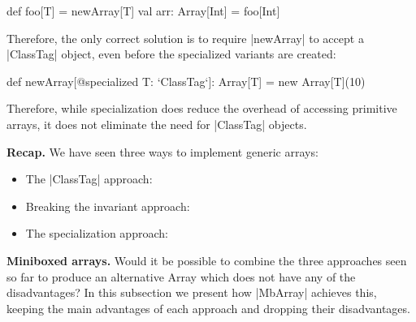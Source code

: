 \begin{lstlisting-nobreak}
 def foo[T] = newArray[T]
 val arr: Array[Int] = foo[Int]
\end{lstlisting-nobreak}

Therefore, the only correct solution is to require |newArray| to accept a |ClassTag| object, even before the specialized variants are created:

\begin{lstlisting-nobreak}
 def newArray[@specialized T: `ClassTag`]: Array[T] =
   new Array[T](10)
\end{lstlisting-nobreak}

Therefore, while specialization does reduce the overhead of accessing primitive arrays, it does not eliminate the need for |ClassTag| objects.

\textbf{Recap.} We have seen three ways to implement generic arrays:

\vspace{-1em}
\begin{itemize}
  \item The |ClassTag| approach:
  \item Breaking the invariant approach:
  \item The specialization approach:
\end{itemize}
\vspace{-1em}

\textbf{Miniboxed arrays.} Would it be possible to combine the three approaches seen so far to produce an alternative Array which does not have any of the disadvantages? In this subsection we present how |MbArray| achieves this, keeping the main advantages of each approach and dropping their disadvantages.


